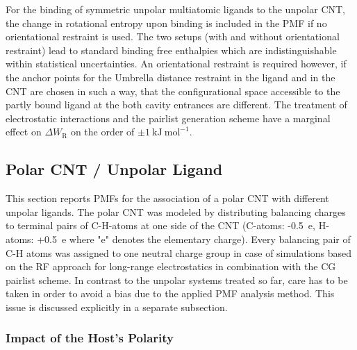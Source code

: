 \documentclass[9pt,lessons]{livecoms}
\begin{document}
For the binding of symmetric unpolar multiatomic ligands to the unpolar CNT, the change in rotational entropy upon binding is included in the PMF if no orientational restraint is used.
The two setups (with and without orientational restraint) lead to standard binding free enthalpies which are indistinguishable within statistical uncertainties.
An orientational restraint is required however, if the anchor points for the Umbrella distance restraint in the ligand and in the CNT are chosen in such a way, 
that the configurational space accessible to the partly bound ligand at the both cavity entrances are different. 
The treatment of electrostatic interactions and the pairlist generation scheme have a marginal effect on $\Delta W_\mathrm{R}$ on the order of $\pm 1~\mathrm{kJ}~\mathrm{mol}^{-1}$.

\subsection{Polar CNT / Unpolar Ligand}
\label{subsec:pol_host_unp_lig}

This section reports PMFs for the association of a polar CNT with different unpolar ligands.
The polar CNT was modeled by distributing balancing charges to terminal pairs of C-H-atoms at one side of the CNT (C-atoms: -0.5~e, H-atoms: +0.5~e where "e" denotes the elementary charge).
Every balancing pair of C-H atoms was assigned to one neutral charge group in case of simulations based on the RF approach for long-range electrostatics in combination with the CG pairlist scheme.
In contrast to the unpolar systems treated so far, care has to be taken in order to avoid a bias due to the applied PMF analysis method. 
This issue is discussed explicitly in a separate subsection. 

\subsubsection*{Impact of the Host's Polarity}
\end{document}
